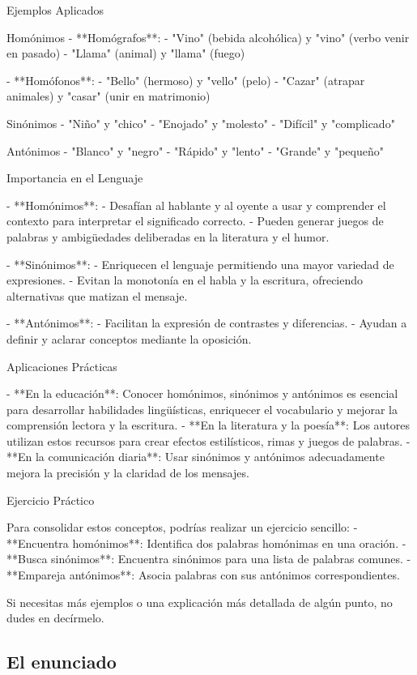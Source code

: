  Ejemplos Aplicados

 Homónimos
- **Homógrafos**:
  - "Vino" (bebida alcohólica) y "vino" (verbo venir en pasado)
  - "Llama" (animal) y "llama" (fuego)
  
- **Homófonos**:
  - "Bello" (hermoso) y "vello" (pelo)
  - "Cazar" (atrapar animales) y "casar" (unir en matrimonio)

 Sinónimos
- "Niño" y "chico"
- "Enojado" y "molesto"
- "Difícil" y "complicado"

 Antónimos
- "Blanco" y "negro"
- "Rápido" y "lento"
- "Grande" y "pequeño"

 Importancia en el Lenguaje

- **Homónimos**:
  - Desafían al hablante y al oyente a usar y comprender el contexto para interpretar el significado correcto.
  - Pueden generar juegos de palabras y ambigüedades deliberadas en la literatura y el humor.

- **Sinónimos**:
  - Enriquecen el lenguaje permitiendo una mayor variedad de expresiones.
  - Evitan la monotonía en el habla y la escritura, ofreciendo alternativas que matizan el mensaje.

- **Antónimos**:
  - Facilitan la expresión de contrastes y diferencias.
  - Ayudan a definir y aclarar conceptos mediante la oposición.

 Aplicaciones Prácticas

- **En la educación**: Conocer homónimos, sinónimos y antónimos es esencial para desarrollar habilidades lingüísticas, enriquecer el vocabulario y mejorar la comprensión lectora y la escritura.
- **En la literatura y la poesía**: Los autores utilizan estos recursos para crear efectos estilísticos, rimas y juegos de palabras.
- **En la comunicación diaria**: Usar sinónimos y antónimos adecuadamente mejora la precisión y la claridad de los mensajes.

 Ejercicio Práctico

Para consolidar estos conceptos, podrías realizar un ejercicio sencillo:
- **Encuentra homónimos**: Identifica dos palabras homónimas en una oración.
- **Busca sinónimos**: Encuentra sinónimos para una lista de palabras comunes.
- **Empareja antónimos**: Asocia palabras con sus antónimos correspondientes.

Si necesitas más ejemplos o una explicación más detallada de algún punto, no dudes en decírmelo.

\subsection{El enunciado}

